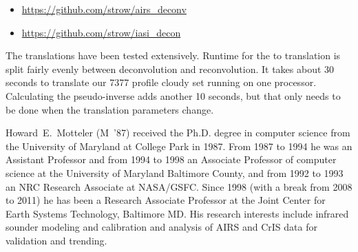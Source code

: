 \documentclass[journal]{IEEEtran}
\begin{document}
\begin{itemize}
   \item \url{https://github.com/strow/airs_deconv}
   \item \url{https://github.com/strow/iasi_decon}
\end{itemize}

The translations have been tested extensively.  Runtime for the
{\airs} to {\cris} translation is split fairly evenly between
deconvolution and reconvolution.  It takes about 30 seconds to
translate our 7377 profile cloudy set running on one processor.
Calculating the pseudo-inverse adds another 10 seconds, but that
only needs to be done when the translation parameters change.


% 
% 




\vspace{10cm}\vfill

\begin{IEEEbiography}{Howard~E.~Motteler}
  (M~'87) received the Ph.D. degree in computer science from the
  University of Maryland at College Park in 1987.  From 1987 to 1994
  he was an Assistant Professor and from 1994 to 1998 an Associate
  Professor of computer science at the University of Maryland
  Baltimore County, and from 1992 to 1993 an NRC Research Associate
  at NASA/GSFC.  Since 1998 (with a break from 2008 to 2011) he has
  been a Research Associate Professor at the Joint Center for Earth
  Systems Technology, Baltimore MD.  His research interests include
  infrared sounder modeling and calibration and analysis of AIRS and
  CrIS data for validation and trending.

\end{IEEEbiography}
\end{document}
